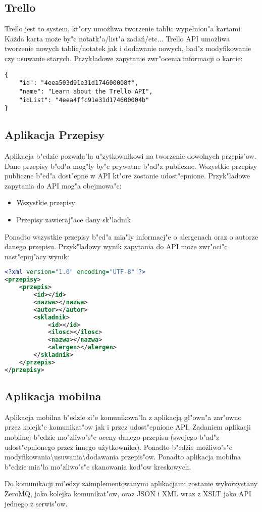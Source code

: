 \documentclass{article}
\begin{document}
\subsection{Trello}
	Trello jest to system, kt"ory umo\.zliwa tworzenie tablic wypełnion"a kartami. Ka\.zda karta mo\.ze by"c notatk"a/list"a zadań/etc... Trello API umo\.zliwa tworzenie nowych tablic/notatek jak i dodawanie nowych, bad"z modyfikowanie czy usuwanie starych. Przykładowe zapytanie zwr"ocenia informacji o karcie:

	\begin{lstlisting}[label=trello,caption=Trello API Example,breaklines=true]
{
    "id": "4eea503d91e31d174600008f",
    "name": "Learn about the Trello API",
    "idList": "4eea4ffc91e31d174600004b"
}
	\end{lstlisting}

\subsection{Aplikacja Przepisy}
	Aplikacja b"edzie pozwala"la u"zytkownikowi na tworzenie dowolnych przepis"ow. Dane przepisy b"ed"a mog"ly by"c prywatne b"ad"z publiczne. Wszystkie przepisy publiczne b"ed"a dost"epne w API kt"ore zostanie udost"epnione. Przyk"ladowe zapytania do API mog"a obejmowa"c:
	\begin{itemize}
		\item Wszystkie przepisy
		\item Przepisy zawieraj"ace dany sk"ladnik
	\end{itemize}
	Ponadto wszystkie przepisy b"ed"a mia"ly informacj"e o alergenach oraz o autorze danego przepisu. Przyk"ladowy wynik zapytania do API mo\.ze zwr"oci"c nast"epuj"acy wynik:

	\begin{lstlisting}[label=example-xml,caption=Przyk"ladowe API w XML,language=XML,breaklines=true]
<?xml version="1.0" encoding="UTF-8" ?>
<przepisy>
    <przepis>
        <id></id>
        <nazwa></nazwa>
        <autor></autor>
        <skladnik>
            <id></id>
            <ilosc></ilosc>
            <nazwa></nazwa>
            <alergen></alergen>
        </skladnik>
    </przepis>
</przepisy>
	\end{lstlisting}

\subsection{Aplikacja mobilna}
	Aplikacja mobilna b"edzie si"e komunikowa"la z aplikacją gł"own"a zar"owno przez kolejk"e komunikat"ow jak i przez udost"epnione API. Zadaniem aplikacji moblinej b"edzie mo"zliwo"s"c oceny danego przepisu (swojego b"ad"z udost"epnionego przez innego u\.zytkownika). Ponadto b"edzie mo\.zliwo"s"c modyfikowania{\textbackslash}usuwania{\textbackslash}dodawania przepis"ow. Ponadto aplikacja mobilna b"edzie mia"la mo"zliwo"s"c skanowania kod"ow kreskowych.

	Do komunikacji mi"edzy zaimplementowanymi aplikacjami zostanie wykorzystany ZeroMQ, jako kolejka komunikat"ow, oraz JSON i XML wraz z XSLT jako API jednego z serwis"ow. 
\end{document}

